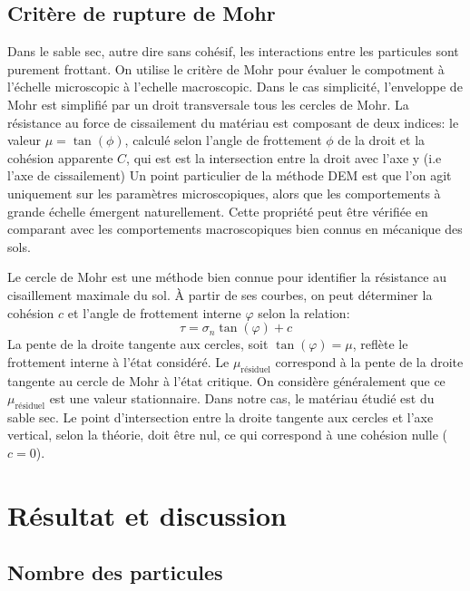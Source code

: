 \documentclass[5p,authoryear,square]{elsarticle}
\begin{document}
\subsection{Critère de rupture de Mohr} \label{Mohr}
Dans le sable sec, autre dire sans cohésif, les interactions entre les particules sont purement frottant. 
On utilise le critère de Mohr pour évaluer le compotment à l'échelle microscopic à l'echelle macroscopic.
Dans le cas simplicité, l'enveloppe de Mohr est simplifié par un droit transversale tous les cercles de Mohr.
La résistance au force de cissailement du matériau est composant de deux indices: le valeur $\mu = \tan(\phi)$, calculé selon l'angle de frottement $\phi$ de la droit et la cohésion apparente $C$, qui est est la intersection entre la droit avec l'axe y (i.e l'axe de cissailement)
Un point particulier de la méthode DEM est que l'on agit uniquement sur les paramètres microscopiques, alors que les comportements à grande échelle émergent naturellement.  
Cette propriété peut être vérifiée en comparant avec les comportements macroscopiques bien connus en mécanique des sols.  

Le cercle de Mohr est une méthode bien connue pour identifier la résistance au cisaillement maximale du sol.  
À partir de ses courbes, on peut déterminer la cohésion $c$ et l'angle de frottement interne $\varphi$ selon la relation:
\begin{equation}
    \tau = \sigma_n \tan(\varphi) + c
    \label{eq:tangentMohr}
\end{equation}
La pente de la droite tangente aux cercles, soit $\tan(\varphi) = \mu$, reflète le frottement interne à l'état considéré.  
Le $\mu_{\text{résiduel}}$ correspond à la pente de la droite tangente au cercle de Mohr à l'état critique.  
On considère généralement que ce $\mu_{\text{résiduel}}$ est une valeur stationnaire.  
Dans notre cas, le matériau étudié est du sable sec. Le point d'intersection entre la droite tangente aux cercles et l'axe vertical, selon la théorie, doit être nul, ce qui correspond à une cohésion nulle ($c=0$).

\section{Résultat et discussion}\label{resultat}

\subsection{Nombre des particules}\label{N}
\end{document}
